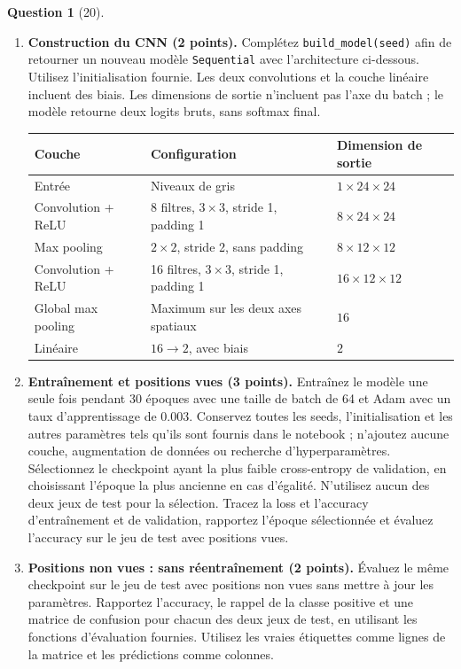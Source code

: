 \documentclass[12pt]{article}
\theoremstyle{definition}
\newtheorem{exercise}{Question}
\begin{document}
\begin{exercise}[20]
{\begin{enumerate}[label=\textbf{2.2.\arabic*}, leftmargin=*]
    \item \textbf{Construction du CNN (2 points).}
    Complétez \texttt{build\_model(seed)} afin de retourner un nouveau
    modèle \texttt{Sequential} avec l'architecture ci-dessous.
    Utilisez l'initialisation fournie. Les deux convolutions et la
    couche linéaire incluent des biais. Les dimensions de sortie
    n'incluent pas l'axe du batch ; le modèle retourne deux logits
    bruts, sans softmax final.

    \begin{center}
    \begin{tabular}{lll}
    \toprule
    Couche & Configuration & Dimension de sortie \\
    \midrule
    Entrée & Niveaux de gris & $1\times24\times24$ \\
    Convolution + ReLU & 8 filtres, $3\times3$, stride 1, padding 1
        & $8\times24\times24$ \\
    Max pooling & $2\times2$, stride 2, sans padding
        & $8\times12\times12$ \\
    Convolution + ReLU & 16 filtres, $3\times3$, stride 1, padding 1
        & $16\times12\times12$ \\
    Global max pooling & Maximum sur les deux axes spatiaux & $16$ \\
    Linéaire & $16\rightarrow2$, avec biais & $2$ \\
    \bottomrule
    \end{tabular}
    \end{center}

    \item \textbf{Entraînement et positions vues (3 points).}
    Entraînez le modèle une seule fois pendant 30 époques avec une
    taille de batch de 64 et Adam avec un taux d'apprentissage de
    $0.003$. Conservez toutes les seeds, l'initialisation et les autres
    paramètres tels qu'ils sont fournis dans le notebook ; n'ajoutez
    aucune couche, augmentation de données ou recherche
    d'hyperparamètres.
    Sélectionnez le checkpoint ayant la plus faible cross-entropy de
    validation, en choisissant l'époque la plus ancienne en cas
    d'égalité. N'utilisez aucun des deux jeux de test pour la sélection.
    Tracez la loss et l'accuracy d'entraînement et de validation,
    rapportez l'époque sélectionnée et évaluez l'accuracy sur le jeu
    de test avec positions vues.

    \item \textbf{Positions non vues : sans réentraînement (2 points).}
    Évaluez le même checkpoint sur le jeu de test avec positions non
    vues sans mettre à jour les paramètres. Rapportez l'accuracy, le
    rappel de la classe positive et une matrice de confusion pour
    chacun des deux jeux de test, en utilisant les fonctions
    d'évaluation fournies. Utilisez les vraies étiquettes comme lignes
    de la matrice et les prédictions comme colonnes.


\end{enumerate}}
\end{exercise}
\end{document}
